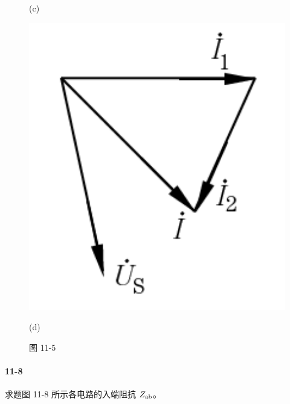 \documentclass[hyperref, UTF8]{ctexart}
\begin{document}
\begin{figure}[!htb]
\begin{minipage}[t]{0.144\textwidth}
\caption*{(c)}
\end{minipage}
\begin{minipage}[t]{0.143\textwidth}
\centering
\includegraphics[width=1\textwidth]{p11-5-d-sol.png}
\caption*{(d)}
\end{minipage}
\caption*{图 11-5}
\end{figure}

\paragraph{11-8}\label{11-8}
求题图 11-8 所示各电路的入端阻抗 $Z_{\rm ab}$。
\end{document}
